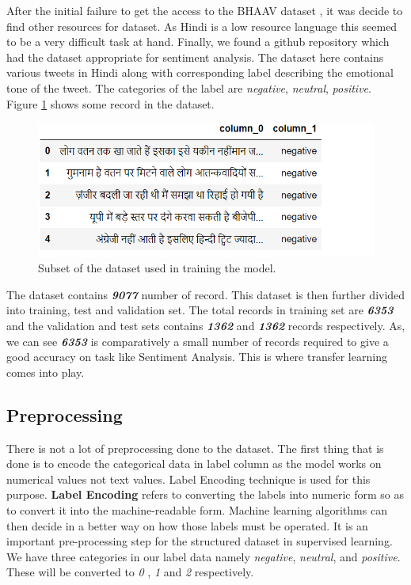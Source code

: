 \documentclass[a4paper, 12pt]{article}
\begin{document}
\begin{sloppypar}
After the initial failure to get the access to the BHAAV dataset\cite{kumar_bhaav_2019}
 , it was decide to find other resources for dataset. As Hindi is a low resource language this seemed to be a very difficult task at hand. Finally, we found a github repository\cite{sinha_sid573hindi_sentiment_analysis_2021}
 which had the dataset appropriate for sentiment analysis. The dataset here contains various tweets in Hindi along with corresponding label describing the emotional tone of the tweet. The categories of the label are \textit{negative}, \textit{neutral}, \textit{positive}. Figure \ref{dataset} shows some record in the dataset.
 
 \begin{figure}[H]
 \begin{center}
 \includegraphics[scale=0.8]{dataset.png}
 \caption{ Subset of the dataset used in training the model.\label{dataset}}
 \end{center}
 \end{figure}
 
 The dataset contains \textit{\textbf{9077}} number of record. This dataset is then further divided into training, test and validation set. The total records in training set are \textit{\textbf{6353}} and the validation and test sets contains \textit{\textbf{1362}} and \textit{\textbf{1362}} records respectively. As, we can see \textit{\textbf{6353}} is comparatively a small number of records required to give a good accuracy on task like Sentiment Analysis. This is where transfer learning comes into play.
 
 \subsection{Preprocessing}
 
 There is not a lot of preprocessing done to the dataset. The first thing that is done is to encode the categorical data in label column as the model works on numerical values not text values. Label Encoding technique is used for this purpose. \textbf{Label Encoding} refers to converting the labels into numeric form so as to convert it into the machine-readable form. Machine learning algorithms can then decide in a better way on how those labels must be operated. It is an important pre-processing step for the structured dataset in supervised learning.\cite{noauthor_ml_2018}
 We have three categories in our label data namely \textit{negative}, \textit{neutral}, and \textit{positive}. These will be converted to \textit{0} , \textit{1} and \textit{2} respectively.
 

\end{sloppypar}
\end{document}
